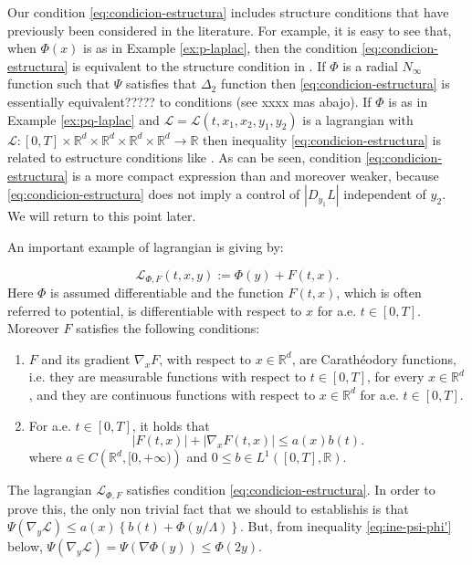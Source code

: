 \documentclass[twoside]{article}
\makeatletter
\theoremstyle{remark}
\newcommand{\labitem}[2]{%
\def\@itemlabel{\textbf{#1}}
\item
\def\@currentlabel{#1}\label{#2}}
\newcommand{\rr}{\mathbb{R}}
\renewcommand{\leq}{\leqslant}
\newcounter{example}[section]
\makeatother
\begin{document}
Our condition \eqref{eq:condicion-estructura} includes structure conditions that have previously been considered in the literature. For example, it is easy to see that, when $\Phi(x)$ is as in Example \ref{ex:p-laplac}, then  the condition \eqref{eq:condicion-estructura}  is equivalent to the structure condition in  \cite[Th. 1.4]{mawhin2010critical}.  If $\Phi$ is a radial $N_{\infty}$ function such that $\Psi$ satisfies that $\Delta_2$ function  then \eqref{eq:condicion-estructura} is essentially equivalent????? to conditions  \cite[Eq. (2)-(4)]{ABGMS2015} (see xxxx mas abajo).   If $\Phi$ is as in Example \ref{ex:pq-laplac} and $\mathcal{L}=\mathcal{L}(t,x_1,x_2,y_1,y_2)$ is a lagrangian with $\mathcal{L}:[0,T]\times\rr^d\times\rr^d\times\rr^d\times\rr^d\to\rr$ then inequality \eqref{eq:condicion-estructura} is related to estructure conditions like
\cite[Lemma 3.1, Eq. (3.1)]{Tian2007192}. As can be seen, condition \eqref{eq:condicion-estructura} is a more compact expression than \cite[Lemma 3.1, Eq. (3.1)]{Tian2007192} and moreover   weaker, because  \eqref{eq:condicion-estructura} does not imply a control of
$|D_{y_1}L|$ independent of $y_2$.  We will return to this point later.


An important example of lagrangian  is giving by:

\begin{equation}\label{eq:lagrange_phi}
\mathcal{L}_{\Phi,F}(t,x,y):=\Phi(y)+F(t,x).
\end{equation}
Here $\Phi$ is assumed differentiable and the function $F(t,x)$, which is often referred to potential,  is differentiable with respect to $x$ for a.e. $t\in [0,T]$. Moreover $F$ satisfies the following conditions:
\begin{enumerate}
\labitem{(C)}{item:condicion_c} $F$ and its gradient $\nabla_x F$, with respect to $x\in\rr^d$,  are  Carath\'eodory functions, i.e. they are measurable functions with respect to $t\in [0,T]$, for every  $x\in\rr^d$, and they are continuous functions with  respect to  $x\in\rr^d$ for a.e. $t \in [0,T]$.
 \labitem{(A)}{item:condicion_a}  For   a.e. $t\in [0,T]$, it holds that
\begin{equation}\label{eq:phi-lagrange}
|F(t,x)| + |\nabla_x F(t,x)|  \leq a(x)b(t).
\end{equation}
where  $a\in C\left(\rr^d,[0,+\infty)\right)$ and $0\leq b\in L^1([0,T],\rr)$.
\end{enumerate}

The lagrangian $\mathcal{L}_{\Phi,F}$ satisfies condition  \eqref{eq:condicion-estructura}. In order to prove this, the only non trivial fact that we should to establishis is that $ \Psi(\nabla_{y}\mathcal{L})
\leq
a(x)\left\{b(t)+ \Phi\left({y}/{\Lambda}\right)\right\}$. But, from inequality \eqref{eq:ine-psi-phi'} below, 
$\Psi(\nabla_{y}\mathcal{L})=\Psi\left(\nabla\Phi(y)\right)\leq \Phi(2y)$.
\end{document}

